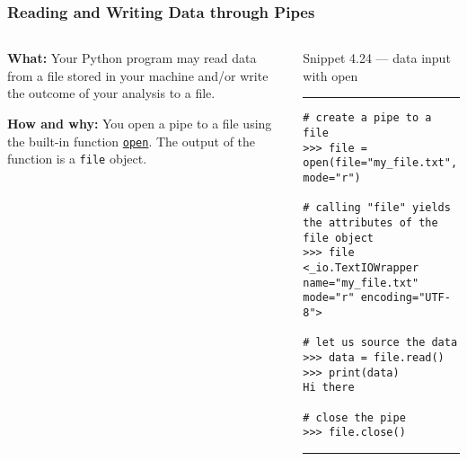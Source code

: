 \documentclass[aspectratio=1610]{beamer}
\begin{document}
\begin{frame}[fragile]
    \frametitle{Reading and Writing Data through Pipes}
\begin{columns}
    \begin{column}{0.30\textwidth}
    \quad \textbf{What:} 
    Your Python program may read data from a file stored in your machine and/or write the outcome of your analysis to a file. 
    \vspace{1em}

    \quad \textbf{How and why:}
    You open a pipe to a file using the built-in function \href{https://docs.python.org/3/library/functions.html\#open}{\texttt{open}}. The output of the function is a \texttt{file} object.
    \end{column}
    \begin{column}{0.60\textwidth}
        Snippet 4.24 --- data input with open
    \rule{\textwidth}{1pt}
        \scriptsize
        \begin{verbatim}          
# create a pipe to a file
>>> file = open(file="my_file.txt", mode="r")

# calling "file" yields the attributes of the file object
>>> file
<_io.TextIOWrapper name="my_file.txt" mode="r" encoding="UTF-8">

# let us source the data
>>> data = file.read()
>>> print(data)
Hi there

# close the pipe
>>> file.close()
        \end{verbatim}
    \rule{\textwidth}{1pt}
    \end{column}
\end{columns}
\end{frame}
\end{document}
